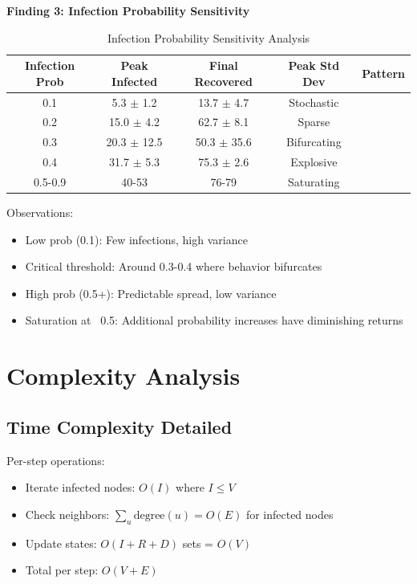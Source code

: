 \documentclass[12pt,a4paper]{article}
\begin{document}
\textbf{Finding 3: Infection Probability Sensitivity}

\begin{table}[h]
\centering
\begin{tabular}{ccccc}
\toprule
\textbf{Infection Prob} & \textbf{Peak Infected} & \textbf{Final Recovered} & \textbf{Peak Std Dev} & \textbf{Pattern} \\
\midrule
0.1 & 5.3 $\pm$ 1.2 & 13.7 $\pm$ 4.7 & Stochastic \\
0.2 & 15.0 $\pm$ 4.2 & 62.7 $\pm$ 8.1 & Sparse \\
0.3 & 20.3 $\pm$ 12.5 & 50.3 $\pm$ 35.6 & Bifurcating \\
0.4 & 31.7 $\pm$ 5.3 & 75.3 $\pm$ 2.6 & Explosive \\
0.5-0.9 & 40-53 & 76-79 & Saturating \\
\bottomrule
\end{tabular}
\caption{Infection Probability Sensitivity Analysis}
\end{table}

Observations:
\begin{itemize}
    \item Low prob (0.1): Few infections, high variance
    \item Critical threshold: Around 0.3-0.4 where behavior bifurcates
    \item High prob (0.5+): Predictable spread, low variance
    \item Saturation at ~0.5: Additional probability increases have diminishing returns
\end{itemize}

\section{Complexity Analysis}

\subsection{Time Complexity Detailed}

Per-step operations:
\begin{itemize}
    \item Iterate infected nodes: $O(I)$ where $I \leq V$
    \item Check neighbors: $\sum_u \text{degree}(u) = O(E)$ for infected nodes
    \item Update states: $O(I + R + D)$ sets = $O(V)$
    \item Total per step: $O(V + E)$
\end{itemize}
\end{document}
